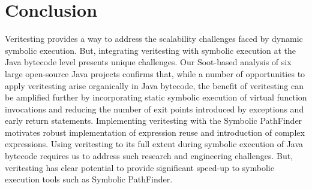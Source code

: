 \section{Conclusion}
Veritesting provides a way to address the scalability challenges faced by dynamic symbolic execution.
%
But, integrating veritesting with symbolic execution at the Java bytecode level presents unique challenges.
%
Our Soot-based analysis of six large open-source Java projects confirms that, while a number of opportunities to apply veritesting arise organically in Java bytecode, the benefit of veritesting can be amplified further by incorporating static symbolic execution of virtual function invocations and reducing the number of exit points introduced by exceptions and early return statements.
%
Implementing veritesting with the Symbolic PathFinder motivates robust implementation of expression reuse and introduction of complex expressions.
%
Using veritesting to its full extent during symbolic execution of Java bytecode requires us to address such research and engineering challenges.
%
But, veritesting has clear potential to provide significant speed-up to symbolic execution tools such as Symbolic PathFinder.
